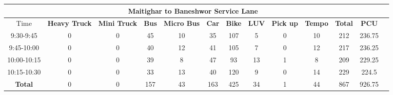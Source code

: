 \begin{landscape}
\begin{table}[h!]
\begin{tabular}{|c|c|c|c|c|c|c|c|c|c|c|c|c|}
    \hline
    \multicolumn{12}{|c|}{\textbf{Maitighar to Baneshwor Service Lane}} \\
    \hline
        Time & \textbf{Heavy Truck} & \textbf{Mini Truck} & \textbf{Bus} & \textbf{Micro Bus} & \textbf{Car} & \textbf{Bike} & \textbf{LUV} & \textbf{Pick up} & \textbf{Tempo} & \textbf{\textbf{Total}} & \textbf{PCU} \\
    \hline
9:30-9:45	&0	&0	&45	&10	&35	&107	&5	&0	&10	&212	&236.75 \\ \hline
9:45-10:00	&0	&0	&40	&12	&41	&105	&7	&0	&12	&217	&236.25 \\ \hline
10:00-10:15	&0	&0	&39	&8	&47	&93	&13	&1	&8	&209	&229.25 \\ \hline
10:15-10:30	&0	&0	&33	&13	&40	&120	&9	&0	&14	&229	&224.5 \\ \hline
\textbf{Total}	&0	&0	&157	&43	&163	&425	&34	&1	&44	&867	&926.75 \\ \hline

\end{tabular}

\end{table}
\end{landscape}


